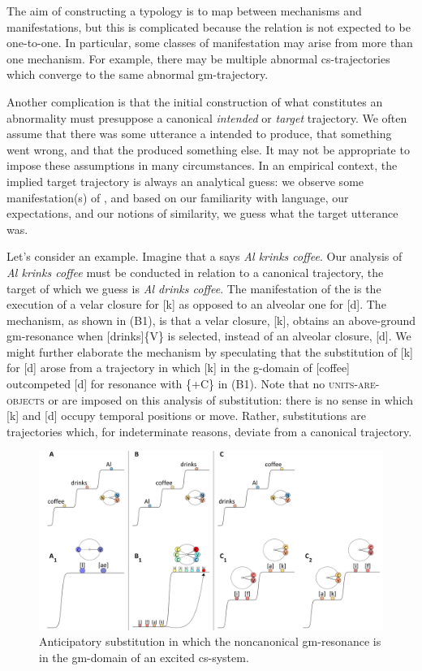  The aim of constructing a  typology is to map between mechanisms and manifestations, but this is complicated because the relation is not expected to be one-to-one. In particular, some classes of manifestation may arise from more than one mechanism. For example, there may be multiple abnormal cs-trajectories which converge to the same abnormal gm-trajectory. 

  Another complication is that the initial construction of what constitutes an abnormality must presuppose a canonical \textit{intended} or \textit{target} trajectory. We often assume that there was some utterance a  intended to produce, that something went wrong, and that the  produced something else. It may not be appropriate to impose these assumptions in many circumstances. In an empirical context, the implied target trajectory is always an analytical guess: we observe some manifestation(s) of , and based on our familiarity with language, our expectations, and our notions of similarity, we guess what the target utterance was.

  Let's consider an example. Imagine that a  says \textit{Al krinks coffee}. Our analysis of \textit{Al krinks coffee} must be conducted in relation to a canonical trajectory, the target of which we guess is \textit{Al drinks coffee}. The manifestation of the  is the execution of a velar closure for [k] as opposed to an alveolar one for [d]. The mechanism, as shown in {}(B1), is that a velar closure, [k], obtains an above-ground gm-resonance when [drinks]\{V\} is selected, instead of an alveolar closure, [d]. We might further elaborate the mechanism by speculating that the substitution of [k] for [d] arose from a trajectory in which [k] in the g-domain of [coffee] outcompeted [d] for resonance with \{+C\} in (B1). Note that no \textsc{units}\textsc{{}-are-}\textsc{objects} or  are imposed on this analysis of substitution: there is no sense in which [k] and [d] occupy temporal positions or move. Rather, substitutions are trajectories which, for indeterminate reasons, deviate from a canonical trajectory. 

  
\begin{figure}
\includegraphics[width=\textwidth]{figures/Tilsen-img58.png}
\caption{Anticipatory substitution in which the noncanonical gm-resonance is in the gm-domain of an excited cs-system.}
\label{fig:4:8}
\end{figure}
 

